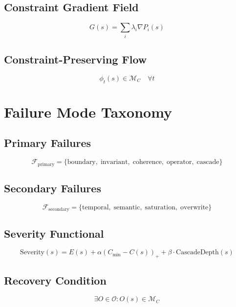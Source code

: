 \documentclass[12pt]{article}
\begin{document}
\subsection{Constraint Gradient Field}

\[
G(s) = \sum_i \lambda_i \nabla P_i(s)
\]

\subsection{Constraint-Preserving Flow}

\[
\phi_t(s) \in \mathcal{M}_C \quad \forall t
\]

\section{Failure Mode Taxonomy}

\subsection{Primary Failures}

\[
\mathcal{F}_{\mathrm{primary}} =
\{\text{boundary},\; \text{invariant},\; \text{coherence},\; \text{operator},\; \text{cascade}\}
\]

\subsection{Secondary Failures}

\[
\mathcal{F}_{\mathrm{secondary}} =
\{\text{temporal},\; \text{semantic},\; \text{saturation},\; \text{overwrite}\}
\]

\subsection{Severity Functional}

\[
\mathrm{Severity}(s) =
E(s) + \alpha (C_{\min} - C(s))_+ + \beta \cdot \mathrm{CascadeDepth}(s)
\]

\subsection{Recovery Condition}

\[
\exists O \in \mathcal{O} : O(s) \in \mathcal{M}_C
\]

\end{document}
